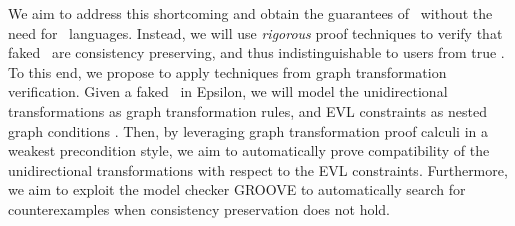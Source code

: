 We aim to address this shortcoming and obtain the guarantees of \BX\ without
the need for \BX\ languages. Instead, we will use \emph{rigorous} proof
techniques to verify that faked \BX\ are consistency preserving, and thus
indistinguishable to users from true \BX. To this end, we propose to apply
techniques from graph transformation verification. Given a faked \BX\ in
Epsilon, we will model the unidirectional transformations as graph
transformation rules, and EVL constraints as nested graph conditions
\cite{Habel-Pennemann09a}. Then, by leveraging graph transformation proof
calculi \cite{Habel-Pennemann-Rensink06a,Poskitt13a,Poskitt-Plump12a} in a
weakest precondition style, we aim to automatically prove compatibility of the
unidirectional transformations with respect to the EVL
constraints. Furthermore, we aim to exploit the model checker GROOVE
\cite{Ghamarian-Mol-Rensink-Zambon-Zimakova12a} to automatically search for
counterexamples when consistency preservation does not hold.


